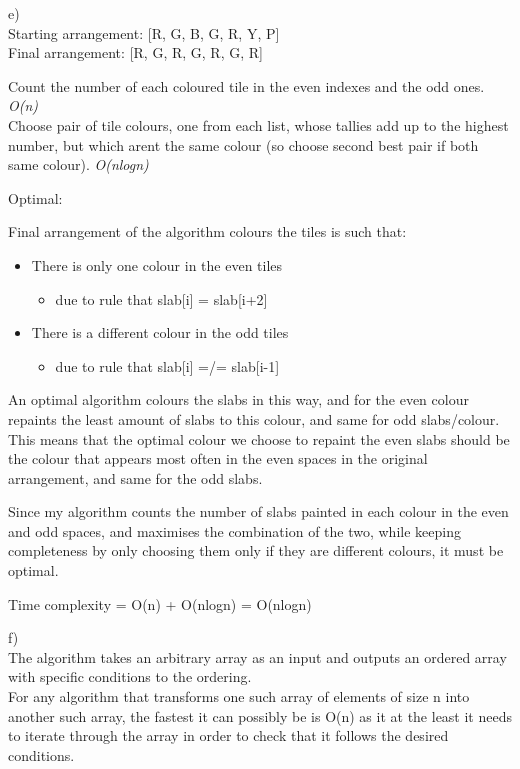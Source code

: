 \documentclass[
]{article}
\providecommand{\tightlist}{%
  \setlength{\itemsep}{0pt}\setlength{\parskip}{0pt}}
\begin{document}
e)\\
Starting arrangement: {[}R, G, B, G, R, Y, P{]}\\
Final arrangement: {[}R, G, R, G, R, G, R{]}

Count the number of each coloured tile in the even indexes and the odd
ones. \emph{O(n)}\\
Choose pair of tile colours, one from each list, whose tallies add up to
the highest number, but which aren\textquotesingle t the same colour (so
choose second best pair if both same colour). \emph{O(nlogn)}

Optimal:

Final arrangement of the algorithm colours the tiles is such that:

\begin{itemize}
\tightlist
\item
  There is only one colour in the even tiles

  \begin{itemize}
  \tightlist
  \item
    due to rule that slab{[}i{]} = slab{[}i+2{]}
  \end{itemize}
\item
  There is a different colour in the odd tiles

  \begin{itemize}
  \tightlist
  \item
    due to rule that slab{[}i{]} =/= slab{[}i-1{]}
  \end{itemize}
\end{itemize}

An optimal algorithm colours the slabs in this way, and for the even
colour repaints the least amount of slabs to this colour, and same for
odd slabs/colour.\\
This means that the optimal colour we choose to repaint the even slabs
should be the colour that appears most often in the even spaces in the
original arrangement, and same for the odd slabs.

Since my algorithm counts the number of slabs painted in each colour in
the even and odd spaces, and maximises the combination of the two, while
keeping completeness by only choosing them only if they are different
colours, it must be optimal.

Time complexity = O(n) + O(nlogn) = O(nlogn)

f)\\
The algorithm takes an arbitrary array as an input and outputs an
ordered array with specific conditions to the ordering.\\
For any algorithm that transforms one such array of elements of size n
into another such array, the fastest it can possibly be is O(n) as it at
the least it needs to iterate through the array in order to check that
it follows the desired conditions.
\end{document}
